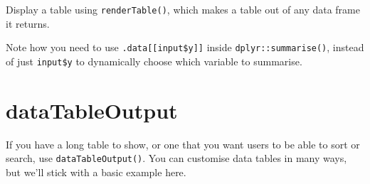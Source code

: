 \documentclass[
]{book}
\newenvironment{Shaded}{\begin{snugshade}}{\end{snugshade}}
\newcommand{\AttributeTok}[1]{\textcolor[rgb]{0.77,0.63,0.00}{#1}}
\newcommand{\CommentTok}[1]{\textcolor[rgb]{0.56,0.35,0.01}{\textit{#1}}}
\newcommand{\DecValTok}[1]{\textcolor[rgb]{0.00,0.00,0.81}{#1}}
\newcommand{\FunctionTok}[1]{\textcolor[rgb]{0.00,0.00,0.00}{#1}}
\newcommand{\NormalTok}[1]{#1}
\newcommand{\OtherTok}[1]{\textcolor[rgb]{0.56,0.35,0.01}{#1}}
\newcommand{\SpecialCharTok}[1]{\textcolor[rgb]{0.00,0.00,0.00}{#1}}
\newcommand{\StringTok}[1]{\textcolor[rgb]{0.31,0.60,0.02}{#1}}
\begin{document}
Display a table using \texttt{renderTable()}, which makes a table out of any data frame it returns.

\begin{Shaded}
\end{Shaded}

Note how you need to use \texttt{.data{[}{[}input\$y{]}{]}} inside \texttt{dplyr::summarise()}, instead of just \texttt{input\$y} to dynamically choose which variable to summarise.

\hypertarget{datatableoutput}{%
\section{dataTableOutput}\label{datatableoutput}}

If you have a long table to show, or one that you want users to be able to sort or search, use \texttt{dataTableOutput()}. You can customise data tables in many ways, but we'll stick with a basic example here.

\begin{Shaded}
\end{Shaded}
\end{document}
